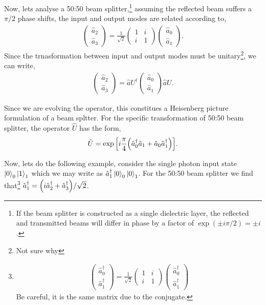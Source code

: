 \documentclass[a4paper]{tufte-handout} %
\newcommand{\hata}{\hat{a}}
\newcommand{\hatad}{\hat{a}^\dagger}
\begin{document}
Now, lets analyse a 50:50 beam splitter,\footnote{If the beam splitter is constructed as a single dielectric layer, the reflected and transmitted beams will differ in phase by a factor of $\exp(\pm i\pi/2) = \pm i$.}
assuming the reflected beam suffers a $\pi/2$ phase shifts, the input and output modes are related according to,
\begin{gather*}
    \begin{pmatrix}
        \hata_2 \\ \hata_3
    \end{pmatrix}
    =
    \frac{1}{\sqrt{2}}
    \begin{pmatrix}
        1 & i \\ i & 1
    \end{pmatrix}
    \begin{pmatrix}
        \hata_0 \\ \hata_1
    \end{pmatrix}.
\end{gather*}
Since the trnasformation between input and output modes must be unitary\footnote{Not sure why}, we can write,
\begin{gather*}
    \begin{pmatrix}
        \hata_2 \\ \hata_3
    \end{pmatrix}
    =
    \hata{U}^\dagger
    \begin{pmatrix}
        \hata_0 \\ \hata_1
    \end{pmatrix}
    \hata{U}.
\end{gather*}

Since we are evolving the operator, this constitues a Heisenberg picture formulation of a beam spltter.
For the specific transformation of 50:50 beam splitter, the operator $\hat{U}$ has the form,
\begin{gather*}
    \hat{U} = \exp\qty[i\frac{\pi}{4}\qty(\hatad_0\hata_1+\hata_0\hatad_1)].
\end{gather*}

Now, lets do the following example,
consider the single photon input state $\ket{0}_0\ket{1}_1$ which we may write as $\hatad_1\ket{0}_0\ket{0}_1$.
For the 50:50 beam splitter we find that\footnote{
\begin{gather*}
     \begin{pmatrix}
        \hatad_0 \\ \hatad_1
    \end{pmatrix}
    =
    \frac{1}{\sqrt{2}}
    \begin{pmatrix}
        1 & i \\ i & 1
    \end{pmatrix}
    \begin{pmatrix}
        \hatad_0 \\ \hatad_1
    \end{pmatrix}  
\end{gather*}
Be careful, it is the same matrix due to the conjugate.
} $\hatad_1=\qty(i\hatad_2+\hatad_3)/\sqrt{2}$.
\end{document}
